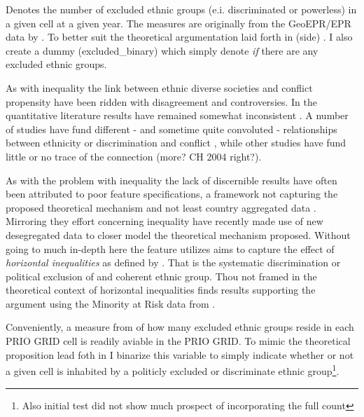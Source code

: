 \documentclass[a4paper]{article}
\begin{document}

Denotes the number of excluded ethnic groups (e.i. discriminated or powerless) in a given cell at a given year. The measures are originally from the GeoEPR/EPR data by \cite{Vogt_2015}. To better suit the theoretical argumentation laid forth in \cite{Cederman_Gleditsch_Buhaug_2013}(side) \citep{prio_code_2015}. I also create a dummy (excluded\_binary) which simply denote \emph{if} there are any excluded ethnic groups. 

As with inequality the link between ethnic diverse societies and conflict propensity have been ridden with disagreement and controversies. In the quantitative literature results have remained somewhat inconsistent \citep[23-24]{Blattman_Miguel_2010}. A number of studies have fund different - and sometime quite convoluted - relationships between ethnicity or discrimination and conflict \citep{Collier_Hoeffler_1998, Fearon_2004, Blimes_2006, Hegre_Sambanis_2006, Goldstone_2010}, while other studies have fund little or no trace of the connection \citep{Fearon_Laitin_2003, Collier_Hoeffler_2004}(more? CH 2004 right?).\par 

As with the problem with inequality the lack of discernible results have often been attributed to poor feature specifications, a framework not capturing the proposed theoretical mechanism and not least country aggregated data \citep{Blimes_2006, Blattman_Miguel_2010, Cederman_Gleditsch_Buhaug_2013}. Mirroring they effort concerning inequality \cite{Cederman_Gleditsch_Buhaug_2013} have recently made use of new desegregated data \citep{Girardin_2015} to closer model the theoretical mechanism proposed. Without going to much in-depth here the feature \cite{Cederman_Gleditsch_Buhaug_2013} utilizes aims to capture the effect of \emph{horizontal inequalities} as defined by \citep[31-35]{Cederman_Gleditsch_Buhaug_2013}. That is the systematic discrimination or political exclusion of and coherent ethnic group. Thou not framed in the theoretical context of horizontal inequalities \cite{Goldstone_2010} finds results supporting the argument using the Minority at Risk data from \cite{Gurr_1995}.\par

Conveniently, a measure from \cite{Girardin_2015} of how many excluded ethnic groups reside in each PRIO GRID cell is readily aviable in the PRIO GRID. To mimic the theoretical proposition lead foth in \cite{Cederman_Gleditsch_Buhaug_2013} I binarize this variable to simply indicate whether or not a given cell is inhabited by a politicly excluded or discriminate ethnic group\footnote{Also initial test did not show much prospect of incorporating the full count}. 
\end{document}
